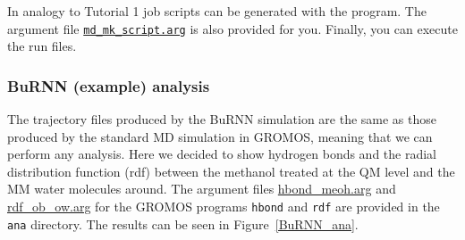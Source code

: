 In analogy to Tutorial 1 job scripts can be generated with the  program. The argument file \href{https://github.com/LierB/gromos_tutorial_livecoms/blob/burnn_tutorial_rc/tutorial_files/t_06/md_burnn/md_mk_script.arg}{\texttt{md\_mk\_script.arg}} is also provided for you. Finally, you can execute the run files.


\subsubsection{BuRNN (example) analysis}
The trajectory files produced by the BuRNN simulation are the same as those produced by the standard MD simulation in GROMOS, meaning that we can perform any analysis. Here we decided to show hydrogen bonds and the radial distribution function (rdf) between the methanol treated at the QM level and the MM water molecules around. The argument files \href{https://github.com/LierB/gromos_tutorial_livecoms/blob/burnn_tutorial_rc/tutorial_files/t_06/md_burnn/ana/hbond/hbond_meoh.arg}{hbond\_meoh.arg} and \href{https://github.com/LierB/gromos_tutorial_livecoms/blob/burnn_tutorial_rc/tutorial_files/t_06/md_burnn/ana/rdf/rdf_ob_ow.arg}{rdf\_ob\_ow.arg} for the GROMOS programs \texttt{hbond} and \texttt{rdf} are provided in the \texttt{ana} directory. 
The results can be seen in Figure~\ref{BuRNN_ana}.

